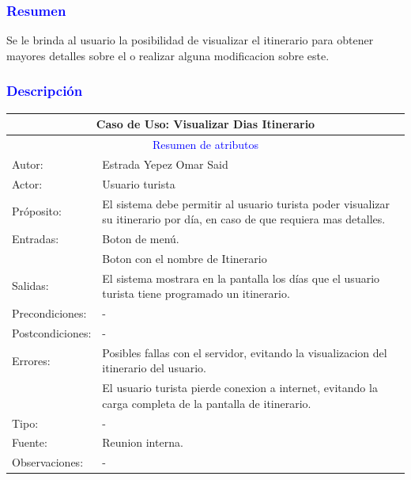 \subsubsection{\textcolor{blue}{Resumen}}
Se le brinda al usuario la posibilidad de visualizar el itinerario para obtener mayores detalles sobre el o realizar alguna modificacion sobre este.
\subsubsection{\textcolor{blue}{Descripción}}
\begin{tabularx}{16cm}{||l|X||}
	\hline
	\multicolumn{2}{||c||}{Caso de Uso: Visualizar Dias Itinerario} \\
	\hline
	\multicolumn{2}{||c||}{\textcolor{blue}{Resumen de atributos}} \\
	\hline
	{Autor:} & Estrada Yepez Omar Said \\
    \hline
	{Actor:} & Usuario turista\\
	\hline
	{Próposito:} & El sistema debe permitir al usuario turista poder visualizar su itinerario por día, en caso de que requiera mas detalles.\\
	\hline
	{Entradas:} &  Boton de menú. \\
    &Boton con el nombre de Itinerario\\
	\hline
	{Salidas:} & El sistema mostrara en la pantalla los días que el usuario turista tiene programado un itinerario.\\
	\hline
	{Precondiciones:} & -\\ 
	\hline
	{Postcondiciones:}& - \\
	\hline
	{Errores:} & Posibles fallas con el servidor, evitando la visualizacion del itinerario del usuario. \\
    & El usuario turista pierde conexion a internet, evitando la carga completa de la pantalla de itinerario.\\
	\hline
	{Tipo:} & -\\
	\hline
	{Fuente:} & Reunion interna. \\
	\hline
	{Observaciones:} & {-} \\
	\hline
\end{tabularx}

\pagebreak

